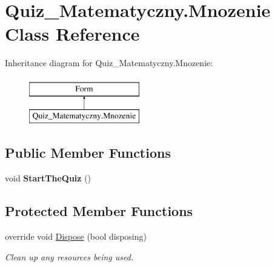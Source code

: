 \hypertarget{class_quiz___matematyczny_1_1_mnozenie}{}\section{Quiz\+\_\+\+Matematyczny.\+Mnozenie Class Reference}
\label{class_quiz___matematyczny_1_1_mnozenie}
Inheritance diagram for Quiz\+\_\+\+Matematyczny.\+Mnozenie\+:\begin{figure}[H]
\begin{center}
\leavevmode
\includegraphics[height=2.000000cm]{class_quiz___matematyczny_1_1_mnozenie}
\end{center}
\end{figure}
\subsection*{Public Member Functions}
\begin{DoxyCompactItemize}
\item 
\mbox{\label{class_quiz___matematyczny_1_1_mnozenie_aee2f847efc4139c44ad3fad2908ee0af}} 
void {\bfseries Start\+The\+Quiz} ()
\end{DoxyCompactItemize}
\subsection*{Protected Member Functions}
\begin{DoxyCompactItemize}
\item 
override void \mbox{\hyperlink{class_quiz___matematyczny_1_1_mnozenie_afc8f3862f2f252837e5416cf2fb5a5c4}{Dispose}} (bool disposing)
\begin{DoxyCompactList}\small\item\em Clean up any resources being used. \end{DoxyCompactList}\end{DoxyCompactItemize}
